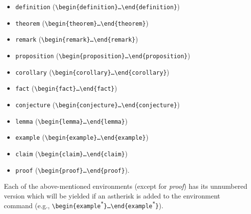 \documentclass[manuscript]{BSLstyle} %
\begin{document}
\begin{itemize}
	\item \texttt{definition} (\texttt{\textbackslash begin\{definition\}\ldots\textbackslash end\{definition\}})
	\item \texttt{theorem} (\texttt{\textbackslash begin\{theorem\}\ldots\textbackslash end\{theorem\}})
	\item \texttt{remark} (\texttt{\textbackslash begin\{remark\}\ldots\textbackslash end\{remark\}})
	\item \texttt{proposition} (\texttt{\textbackslash begin\{proposition\}\ldots\textbackslash end\{proposition\}})
	\item \texttt{corollary} (\texttt{\textbackslash begin\{corollary\}\ldots\textbackslash end\{corollary\}})
	\item \texttt{fact} (\texttt{\textbackslash begin\{fact\}\ldots\textbackslash end\{fact\}})
	\item \texttt{conjecture} (\texttt{\textbackslash begin\{conjecture\}\ldots\textbackslash end\{conjecture\}})
	\item \texttt{lemma} (\texttt{\textbackslash begin\{lemma\}\ldots\textbackslash end\{lemma\}})
	\item \texttt{example} (\texttt{\textbackslash begin\{example\}\ldots\textbackslash end\{example\}})
	\item \texttt{claim} (\texttt{\textbackslash begin\{claim\}\ldots\textbackslash end\{claim\}})
	\item \texttt{proof} (\texttt{\textbackslash begin\{proof\}\ldots\textbackslash end\{proof\}}).
\end{itemize}
Each of the above-mentioned environments (except for \textit{proof}) has its unnumbered version which will be yielded if an astherisk is added to the environment command (e.g., \texttt{\textbackslash begin\{example\textsuperscript{*}\}\ldots\textbackslash end\{example\textsuperscript{*}\}}).
\end{document}
